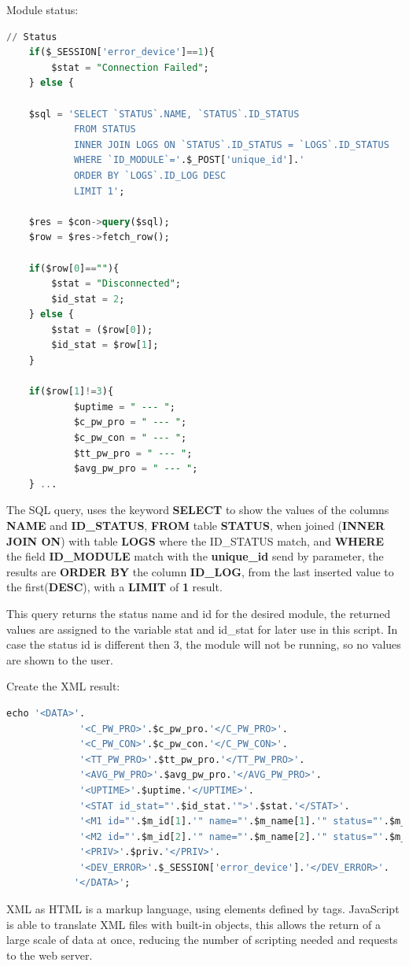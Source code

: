 Module status:
\begin{lstlisting}[language=sql]
	// Status
	if($_SESSION['error_device']==1){
		$stat = "Connection Failed";
	} else {
	
	$sql = 'SELECT `STATUS`.NAME, `STATUS`.ID_STATUS
			FROM STATUS 
			INNER JOIN LOGS ON `STATUS`.ID_STATUS = `LOGS`.ID_STATUS
			WHERE `ID_MODULE`='.$_POST['unique_id'].'
			ORDER BY `LOGS`.ID_LOG DESC 
			LIMIT 1';
	
	$res = $con->query($sql);
	$row = $res->fetch_row();
	
	if($row[0]==""){
		$stat = "Disconnected";
		$id_stat = 2;
	} else {
		$stat = ($row[0]);
		$id_stat = $row[1];
	}
	
	if($row[1]!=3){
			$uptime = " --- ";
			$c_pw_pro = " --- ";
			$c_pw_con = " --- ";
			$tt_pw_pro = " --- ";
			$avg_pw_pro = " --- ";
	} ...
\end{lstlisting}

The SQL query, uses the keyword \textbf{SELECT} to show the values of the columns \textbf{NAME} and \textbf{ID\_STATUS}, \textbf{FROM} table \textbf{STATUS}, when joined (\textbf{INNER JOIN ON}) with table \textbf{LOGS} where the ID\_STATUS match, and \textbf{WHERE} the field \textbf{ID\_MODULE} match with the \textbf{unique\_id} send by parameter, the results are \textbf{ORDER BY} the column \textbf{ID\_LOG}, from the last inserted value to the first(\textbf{DESC}), with a \textbf{LIMIT} of \textbf{1} result.

This query returns the status name and id for the desired module, the returned values are assigned to the variable stat and id\_stat for later use in this script. In case the status id is different then 3, the module will not be running, so no values are shown to the user.

Create the XML result:
\begin{lstlisting}[language=sql]
	echo '<DATA>'.
			 '<C_PW_PRO>'.$c_pw_pro.'</C_PW_PRO>'.
			 '<C_PW_CON>'.$c_pw_con.'</C_PW_CON>'.
			 '<TT_PW_PRO>'.$tt_pw_pro.'</TT_PW_PRO>'.
			 '<AVG_PW_PRO>'.$avg_pw_pro.'</AVG_PW_PRO>'.
			 '<UPTIME>'.$uptime.'</UPTIME>'.
			 '<STAT id_stat="'.$id_stat.'">'.$stat.'</STAT>'.
			 '<M1 id="'.$m_id[1].'" name="'.$m_name[1].'" status="'.$m_status[1].'" id_status="'.$m_id_status[1].'"></M1>'.
			 '<M2 id="'.$m_id[2].'" name="'.$m_name[2].'" status="'.$m_status[2].'" id_status="'.$m_id_status[2].'"></M2>'.
			 '<PRIV>'.$priv.'</PRIV>'.
			 '<DEV_ERROR>'.$_SESSION['error_device'].'</DEV_ERROR>'.
			'</DATA>';
\end{lstlisting}
XML as HTML is a markup language, using elements defined by tags. JavaScript is able to translate XML files with built-in objects, this allows the return of a large scale of data at once, reducing the number of scripting needed and requests to the web server.

